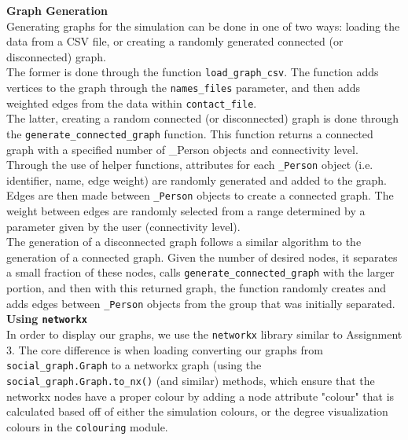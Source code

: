 \documentclass[fontsize=11pt]{article}
\newcommand{\ttt}[1]{\texttt{#1}}
\begin{document}
    \newline
    \textbf{Graph Generation}\\
    Generating graphs for the simulation can be done in one of two ways: loading the data from a CSV file, or creating a randomly generated connected (or disconnected) graph.\\
    \newline
    The former is done through the function \ttt{load\_graph\_csv}. The function adds vertices to the graph through the \ttt{names\_files} parameter, and then adds weighted edges from the data within \ttt{contact\_file}.\\
    \newline
    The latter, creating a random connected (or disconnected) graph is done through the \ttt{generate\_connected\_graph} function. This function returns a connected graph with a specified number of \_Person objects and connectivity level. Through the use of helper functions, attributes for each \ttt{\_Person} object (i.e. identifier, name, edge weight) are randomly generated and added to the graph. Edges are then made between \ttt{\_Person} objects to create a connected graph. The weight between edges are randomly selected from a range determined by a parameter given by the user (connectivity level). \\
    \newline
    The generation of a disconnected graph follows a similar algorithm to the generation of a connected graph. Given the number of desired nodes, it separates a small fraction of these nodes, calls \ttt{generate\_connected\_graph} with the larger portion, and then with this returned graph, the function randomly creates and adds edges between \ttt{\_Person} objects from the group that was initially separated.\\
    \newline
    \noindent
    \textbf{Using \ttt{networkx}} \\
    In order to display our graphs, we use the \ttt{networkx} library similar to Assignment 3. The core difference is when loading converting our graphs from \ttt{social\_graph.Graph} to a networkx graph (using the \ttt{social\_graph.Graph.to\_nx()} (and similar) methods, which ensure that the networkx nodes have a proper colour by adding a node attribute "colour" that is calculated based off of either the simulation colours, or the degree visualization colours in the \ttt{colouring} module.
    \newpage
\end{document}
